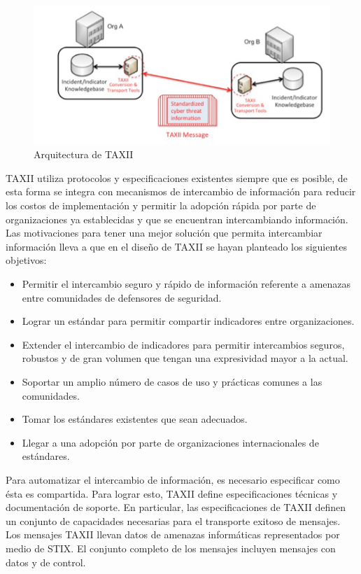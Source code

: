  
\begin{figure}[ht!]
  \centering
    \includegraphics[scale=0.80]{./images/TAXIIArchitecture1.png}
    \caption{Arquitectura de TAXII \protect\cite{b1}}
    \label{fig.diagramabloques}
\end{figure}

TAXII utiliza protocolos y especificaciones existentes siempre que 
es posible, de esta forma se integra con mecanismos de intercambio de 
información para reducir los costos de implementación y permitir la adopción 
rápida por parte de organizaciones ya establecidas y que se encuentran 
intercambiando información.\\

Las motivaciones para tener una mejor solución que permita intercambiar 
información lleva a que en el diseño de TAXII se hayan planteado los siguientes 
objetivos:
 \begin{itemize}
   \item Permitir el intercambio seguro y rápido de información referente a 
   amenazas entre comunidades de defensores de seguridad.
   \item Lograr un estándar para permitir compartir indicadores entre organizaciones.
   \item Extender el intercambio de indicadores para permitir intercambios 
   seguros, robustos y de gran volumen que tengan una expresividad mayor a la 
   actual.
   \item Soportar un amplio número de casos de uso y prácticas comunes a las 
   comunidades.
   \item Tomar los estándares existentes que sean adecuados.
   \item Llegar a una adopción por parte de organizaciones internacionales de 
   estándares.
 \end{itemize}

Para automatizar el intercambio de información, es necesario especificar como 
ésta es compartida. Para lograr esto, TAXII define especificaciones técnicas y 
documentación de soporte. En particular, las especificaciones de TAXII definen 
un conjunto de capacidades necesarias para el transporte exitoso de mensajes. 
Los mensajes TAXII llevan datos de amenazas informáticas representados por medio de STIX. El conjunto completo de los mensajes incluyen mensajes con datos y 
de control.\\

